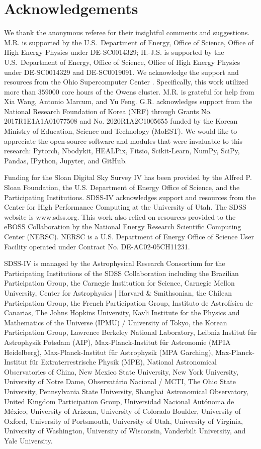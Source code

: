 \section*{Acknowledgements}
We thank the anonymous referee for their insightful comments and suggestions. M.R. is supported by the U.S.~Department of Energy, Office of Science, Office of High Energy Physics under DE-SC0014329; H.-J.S. is supported by the U.S.~Department of Energy, Office of Science, Office of High Energy Physics under DE-SC0014329 and DE-SC0019091. We acknowledge the support and resources from the Ohio Supercomputer Center \citep[OSC;][]{Owens2016}. Specifically, this work utilized more than $359000$ core hours of the Owens cluster. M.R. is grateful for help from Xia Wang, Antonio Marcum, and Yu Feng. G.R. acknowledges support from the National Research Foundation of Korea (NRF) through Grants No. 2017R1E1A1A01077508 and No. 2020R1A2C1005655 funded by the Korean Ministry of Education, Science and Technology (MoEST). We would like to appreciate the open-source software and modules that were invaluable to this research: Pytorch, Nbodykit, HEALPix, Fitsio, Scikit-Learn, NumPy, SciPy, Pandas, IPython, Jupyter, and GitHub.

Funding for the Sloan Digital Sky 
Survey IV has been provided by the 
Alfred P. Sloan Foundation, the U.S. 
Department of Energy Office of 
Science, and the Participating 
Institutions. SDSS-IV acknowledges support and 
resources from the Center for High 
Performance Computing  at the 
University of Utah. The SDSS 
website is www.sdss.org. This work also relied on resources provided to the eBOSS Collaboration by the National Energy Research Scientific Computing Center (NERSC). NERSC is a U.S. Department of Energy Office of Science User Facility operated under Contract No. DE-AC02-05CH11231.
 

SDSS-IV is managed by the 
Astrophysical Research Consortium 
for the Participating Institutions 
of the SDSS Collaboration including 
the Brazilian Participation Group, 
the Carnegie Institution for Science, 
Carnegie Mellon University, Center for 
Astrophysics | Harvard \& 
Smithsonian, the Chilean Participation 
Group, the French Participation Group, 
Instituto de Astrof\'isica de 
Canarias, The Johns Hopkins 
University, Kavli Institute for the 
Physics and Mathematics of the 
Universe (IPMU) / University of 
Tokyo, the Korean Participation Group, 
Lawrence Berkeley National Laboratory, 
Leibniz Institut f\"ur Astrophysik 
Potsdam (AIP),  Max-Planck-Institut 
f\"ur Astronomie (MPIA Heidelberg), 
Max-Planck-Institut f\"ur 
Astrophysik (MPA Garching), 
Max-Planck-Institut f\"ur 
Extraterrestrische Physik (MPE), 
National Astronomical Observatories of 
China, New Mexico State University, 
New York University, University of 
Notre Dame, Observat\'ario 
Nacional / MCTI, The Ohio State 
University, Pennsylvania State 
University, Shanghai 
Astronomical Observatory, United 
Kingdom Participation Group, 
Universidad Nacional Aut\'onoma 
de M\'exico, University of Arizona, 
University of Colorado Boulder, 
University of Oxford, University of 
Portsmouth, University of Utah, 
University of Virginia, University 
of Washington, University of 
Wisconsin, Vanderbilt University, 
and Yale University.
 